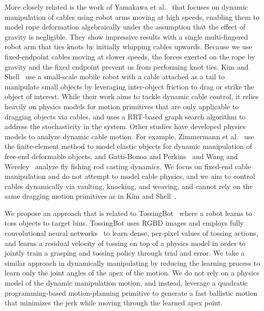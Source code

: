 More closely related is the work of Yamakawa et al.~\cite{dynamic_knotting_2010,yamakawa2012simple,high_speed_knotting_2013,one_hand_knotting_tactile_2007, zhang2016health, devgon2020orienting, lim2021planar, lim2022real2sim2real} that focuses on dynamic manipulation of cables using robot arms moving at high speeds, enabling them to model rope deformation algebraically under the assumption that the effect of gravity is negligible. They show impressive results with a single multi-fingered robot arm that ties knots by initially whipping cables upwards. Because we use fixed-endpoint cables moving at slower speeds, the forces exerted on the rope by gravity and the fixed endpoint prevent us from performing knot ties. %
Kim and Shell~\cite{kim2016using, shen2024diffclip} use a small-scale mobile robot with a cable attached as a tail to manipulate small objects by leveraging inter-object friction to drag or strike the object of interest. While their work aims to tackle dynamic cable control, it relies heavily on physics models for motion primitives that are only applicable to dragging objects via cables, and uses a RRT-based graph search algorithm to address the stochasticity in the system. Other studies have developed physics models to analyze dynamic cable motion. For example, Zimmermann et al.~\cite{zimmermanndynamic} use the finite-element method to model elastic objects for dynamic manipulation of free-end deformable objects, and Gatti-Bonoa and Perkins~\cite{fly_fishing_2004} and Wang and Wereley~\cite{wang2011analysis} analyze fly fishing rod casting dynamics. We focus on fixed-end cable manipulation and do not attempt to model cable physics, and we aim to control cables dynamically via vaulting, knocking, and weaving, and cannot rely on the same dragging motion primitives as in Kim and Shell~\cite{kim2016using}.

We propose an approach that is related to TossingBot~\cite{zeng_tossing_2019} where a robot learns to toss objects to target bins. TossingBot uses RGBD images and employs fully convolutional neural networks~\cite{fcn_2015} to learn dense, per-pixel values of tossing actions, and learns a residual velocity of tossing on top of a physics model in order to jointly train a grasping and tossing policy through trial and error. We take a similar approach in dynamically manipulating by reducing the learning process to learn only the joint angles of the apex of the motion. We do not rely on a physics model of the dynamic manipulation motion, and instead, leverage a quadratic programming-based motion-planning primitive to generate a fast ballistic motion that minimizes the jerk while moving through the learned apex point.
